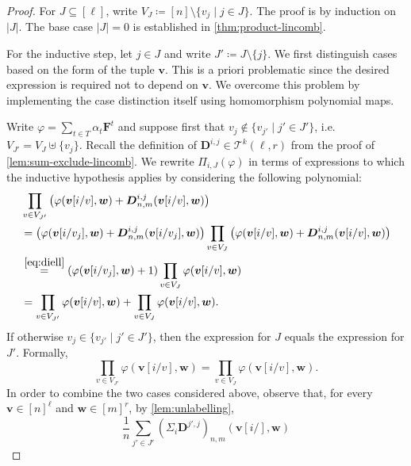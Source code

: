 \documentclass[10pt,a4paper]{article}
\theoremstyle{definition}
\theoremstyle{plain}
\theoremstyle{remark}
\renewcommand{\phi}{\varphi}
\begin{document}
	\begin{proof}
		For $J \subseteq [\ell]$, write $V_J \coloneqq [n] \setminus \{v_j \mid j \in J\}$.
		The proof is by induction on $|J|$.
		The base case $|J| = 0$ is established in \cref{thm:product-lincomb}.
		
		For the inductive step, let $j \in J$ and write $J' \coloneqq J \setminus \{j\}$.
		We first distinguish cases based on the form of the tuple $\boldsymbol{v}$.
		This is a priori problematic since the desired expression is required not to depend on $\boldsymbol{v}$.
		We overcome this problem by implementing the case distinction itself using homomorphism polynomial maps.
		
		Write $\phi = \sum_{t \in T} \alpha_t \boldsymbol{F}^t$ and
		suppose first that $v_j \not\in \{v_{j'} \mid j' \in J'\}$, i.e.\ $V_{J'} = V_{J} \uplus \{v_j\}$.
		Recall the definition of $\boldsymbol{D}^{i,j} \in \mathcal{T}^k(\ell, r)$ from the proof of \cref{lem:sum-exclude-lincomb}.
		We rewrite $\Pi_{i, J} (\phi)$ in terms of expressions to which the inductive hypothesis applies by considering the following polynomial:
		\begin{align*}
			&\prod_{v \in V_{J'}}
			\left( \phi(\boldsymbol{v}[i/v], \boldsymbol{w}) + \boldsymbol{D}^{i, j}_{n, m}(\boldsymbol{v}[i/v], \boldsymbol{w}) \right)  \\
			&= \left( \phi(\boldsymbol{v}[i/v_j], \boldsymbol{w}) + \boldsymbol{D}^{i, j}_{n, m}(\boldsymbol{v}[i/v_j], \boldsymbol{w}) \right)  \prod_{v \in V_{J}}
			\left( \phi(\boldsymbol{v}[i/v], \boldsymbol{w}) + \boldsymbol{D}^{i, j}_{n, m}(\boldsymbol{v}[i/v], \boldsymbol{w}) \right) \\
			&\overset{\eqref{eq:diell}}{=} \left( \phi(\boldsymbol{v}[i/v_j], \boldsymbol{w}) + 1 \right) \prod_{v \in V_{J}} \phi(\boldsymbol{v}[i/v], \boldsymbol{w}) \\
			&= \prod_{v \in V_{J'}}  \phi(\boldsymbol{v}[i/v], \boldsymbol{w}) + \prod_{v \in V_{J}} \phi(\boldsymbol{v}[i/v], \boldsymbol{w}).
		\end{align*}
		If otherwise $v_j \in \{v_{j'} \mid j' \in J'\}$,
		then the expression for $J$ equals the expression for $J'$.
		Formally,
		\[
			\prod_{v \in V_{J'}}\phi(\boldsymbol{v}[i/v], \boldsymbol{w}) 
			= \prod_{v \in V_{J}}\phi(\boldsymbol{v}[i/v], \boldsymbol{w}). 
		\]
		In order to combine the two cases considered above,
		observe that, for every  $\boldsymbol{v} \in [n]^{\ell}$ and $\boldsymbol{w} \in [m]^r$, by \cref{lem:unlabelling},
		\[
			\frac1n \sum_{j' \in J'} (\Sigma_i\boldsymbol{D}^{j', j})_{n,m}(\boldsymbol{v}[i/], \boldsymbol{w}) 
\]
\end{proof}
\end{document}
